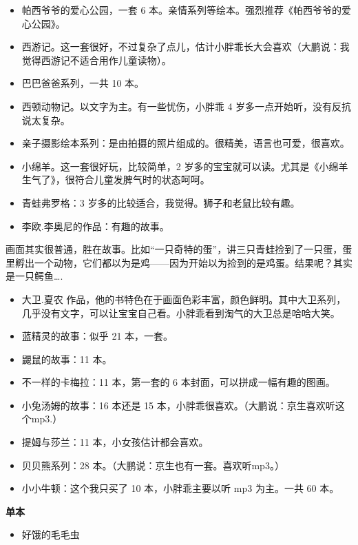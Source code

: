 \documentclass[twoside,openright,headings=optiontohead]{ctexbook} %
\providecommand{\tightlist}{%
   \setlength{\itemsep}{0pt}\setlength{\parskip}{0pt}}
\begin{document}
{\begin{itemize}
\item
  帕西爷爷的爱心公园，一套 6
  本。亲情系列等绘本。强烈推荐《帕西爷爷的爱心公园》。
\item
  西游记。这一套很好，不过复杂了点儿，估计小胖乖长大会喜欢（大鹏说：我觉得西游记不适合用作儿童读物）。
\item
  巴巴爸爸系列，一共 10 本。
\item
  西顿动物记。以文字为主。有一些忧伤，小胖乖 4
  岁多一点开始听，没有反抗说太复杂。
\item
  亲子摄影绘本系列：是由拍摄的照片组成的。很精美，语言也可爱，很喜欢。
\item
  小绵羊。这一套很好玩，比较简单，2
  岁多的宝宝就可以读。尤其是《小绵羊生气了》，很符合儿童发脾气时的状态呵呵。
\item
  青蛙弗罗格：3 岁多的比较适合，我觉得。狮子和老鼠比较有趣。
\item
  李欧.李奥尼的作品：有趣的故事。
\end{itemize}

画面其实很普通，胜在故事。比如``一只奇特的蛋''，讲三只青蛙捡到了一只蛋，蛋里孵出一个动物，它们都以为是鸡------因为开始以为捡到的是鸡蛋。结果呢？其实是一只鳄鱼\ldots{}.

\begin{itemize}
\item
  大卫.夏农
  作品，他的书特色在于画面色彩丰富，颜色鲜明。其中大卫系列，几乎没有文字，可以让宝宝自己看。小胖乖看到淘气的大卫总是哈哈大笑。
\item
  蓝精灵的故事：似乎 21 本，一套。
\item
  鼹鼠的故事：11 本。
\item
  不一样的卡梅拉：11 本，第一套的 6 本封面，可以拼成一幅有趣的图画。
\item
  小兔汤姆的故事：16 本还是 15
  本，小胖乖很喜欢。（大鹏说：京生喜欢听这个mp3.）
\item
  提姆与莎兰：11 本，小女孩估计都会喜欢。
\item
  贝贝熊系列：28 本。（大鹏说：京生也有一套。喜欢听mp3。）
\item
  小小牛顿：这个我只买了 10 本，小胖乖主要以听 mp3 为主。一共 60 本。
\end{itemize}

\textbf{单本}

\begin{itemize}
\tightlist
\item
  好饿的毛毛虫
\end{itemize}

}
\end{document}
